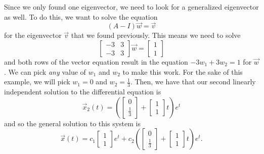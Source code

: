 \documentclass{ximera}
\begin{document}
\begin{exampleSol}
    Since we only found one eigenvector, we need to look for a generalized eigenvector as well. To do this, we want to solve the equation
    \begin{equation*}
        (A - I)\vec{w} = \vec{v}
    \end{equation*} 
    for the eigenvector $\vec{v}$ that we found previously. This means we need to solve
    \begin{equation*}
        \begin{bmatrix} 
            -3 & 3 \\ 
            -3 & 3 
        \end{bmatrix} 
        \vec{w} = 
        \begin{bmatrix} 
            1 \\ 
            1 
        \end{bmatrix}
    \end{equation*}
    and both rows of the vector equation result in the equation $-3w_1 + 3w_2 = 1$ for $\vec{w}$. We can pick \emph{any} value of $w_1$ and $w_2$ to make this work. For the sake of this example, we will pick $w_1 = 0$ and $w_2 = \frac{1}{3}$. Then, we have that our second linearly independent solution to the differential equation is
    \begin{equation*}
        \vec{x}_2(t) = \left(
        \begin{bmatrix} 
            0 \\ 
            \frac{1}{3} 
        \end{bmatrix} + 
        \begin{bmatrix} 
            1 \\ 
            1 
        \end{bmatrix} 
        t \right) e^{t}
    \end{equation*}
    and so the general solution to this system is
    \begin{equation*}
        \vec{x}(t) = c_1 
        \begin{bmatrix} 
            1 \\ 
            1 
        \end{bmatrix} 
        e^t + c_2 \left(
        \begin{bmatrix} 
            0 \\ 
            \frac{1}{3} 
        \end{bmatrix} + 
        \begin{bmatrix} 
            1 \\ 
            1 
        \end{bmatrix} 
        t \right) e^{t}.
    \end{equation*}
    

\end{exampleSol}
\end{document}

